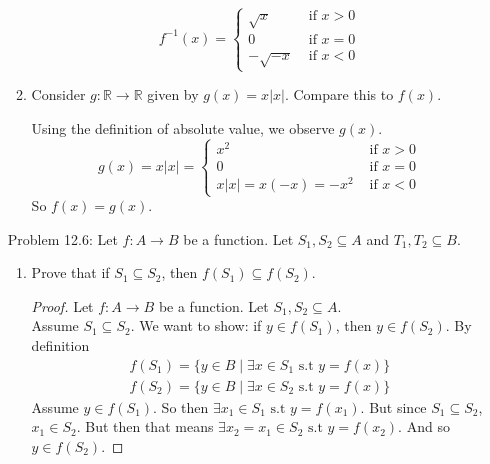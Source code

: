 \documentclass{article}
\theoremstyle{claim}
\theoremstyle{definition}
\begin{document}
\begin{enumerate}
\begin{enumerate}
                \begin{equation*}
                    f^{-1}(x) = \left\{
                    \begin{array}{rl}
                        \sqrt{x} & \text{ if } x > 0\\
                        0 & \text{ if } x = 0\\
                        -\sqrt{-x} & \text{ if } x < 0
                    \end{array} \right.
                \end{equation*}
            \item Consider $g : \mathbb{R} \rightarrow \mathbb{R}$ given by $g(x) = x|x|$. Compare this to $f(x)$.
            \item[] Using the definition of absolute value, we observe $g(x)$.
                \begin{equation*}
                    g(x) = x|x| = \left\{
                    \begin{array}{rl}
                        x^2 & \text{ if } x > 0\\
                        0 & \text{ if } x = 0\\
                        x|x| = x(-x) = -x^2 & \text{ if } x < 0
                    \end{array} \right.
                \end{equation*}
            So $f(x) = g(x)$.
        \end{enumerate}
    \item[Problem 12.6:] Let $f:A \rightarrow B$ be a function. Let $S_1, S_2 \subseteq A$ and $T_1, T_2 \subseteq B$.
        \begin{enumerate}
            \item Prove that if $S_1 \subseteq S_2$, then $f(S_1) \subseteq f(S_2)$.
                \begin{proof}
                    Let $f: A \rightarrow B$ be a function. Let $S_1, S_2 \subseteq A$.\\
                    Assume $S_1 \subseteq S_2$. We want to show: if $y \in f(S_1)$, then $y \in f(S_2)$. By definition 
                    \begin{gather*}
                        f(S_1) = \{ y \in B \mid \exists x \in S_1 \text{ s.t } y = f(x) \}\\
                        f(S_2) = \{ y \in B \mid \exists x \in S_2 \text{ s.t } y = f(x) \}
                    \end{gather*}
                    Assume $y \in f(S_1)$. So then $\exists x_1 \in S_1 \text{ s.t } y = f(x_1)$. But since $S_1 \subseteq S_2$, $x_1 \in S_2$. But then that means $\exists x_2 = x_1 \in S_2 \text{ s.t } y = f(x_2)$. And so $y \in f(S_2)$.

\end{proof}
\end{enumerate}
\end{enumerate}
\end{document}
